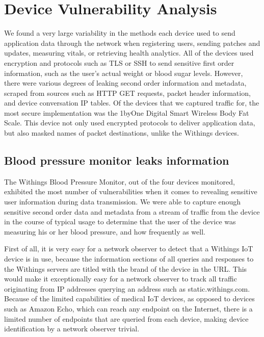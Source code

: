 \section{Device Vulnerability Analysis}

We found a very large variability in the methods each device used to send application data through the network when registering users, sending patches and updates, measuring vitals, or retrieving health analytics. All of the devices used encryption and protocols such as TLS or SSH to send sensitive first order information, such as the user's actual weight or blood sugar levels. However, there were various degrees of leaking second order information and metadata, scraped from sources such as HTTP GET requests, packet header information, and device conversation IP tables. Of the devices that we captured traffic for, the most secure implementation was the 1byOne Digital Smart Wireless Body Fat Scale. This device not only used encrypted protocols to deliver application data, but also masked names of packet destinations, unlike the Withings devices. 

\subsection{Blood pressure monitor leaks information}
The Withings Blood Pressure Monitor, out of the four devices monitored, exhibited the most number of vulnerabilities when it comes to revealing sensitive user information during data transmission. We were able to capture enough sensitive second order data and metadata from a stream of traffic from the device in the course of typical usage to determine that the user of the device was measuring his or her blood pressure, and how frequently as well. 

First of all, it is very easy for a network observer to detect that a Withings IoT device is in use, because the information sections of all queries and responses to the Withings servers are titled with the brand of the device in the URL. This would make it exceptionally easy for a network observer to track all traffic originating from IP addresses querying an address such as static.withings.com. Because of the limited capabilities of medical IoT devices, as opposed to devices such as Amazon Echo, which can reach any endpoint on the Internet, there is a limited number of endpoints that are queried from each device, making device identification by a network observer trivial.


